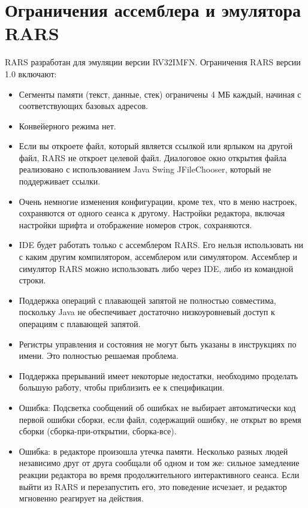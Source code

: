 \section{Ограничения ассемблера и эмулятора RARS}
RARS разработан для эмуляции версии RV32IMFN. Ограничения RARS версии 1.0 включают:
\begin{itemize}
    \item Сегменты памяти (текст, данные, стек) ограничены 4 МБ каждый, начиная с соответствующих базовых адресов.
    \item Конвейерного режима нет.
    \item Если вы откроете файл, который является ссылкой или ярлыком на другой файл, RARS не откроет целевой файл. Диалоговое окно открытия файла реализовано с использованием Java Swing JFileChooser, который не поддерживает ссылки.
    \item Очень немногие изменения конфигурации, кроме тех, что в меню настроек, сохраняются от одного сеанса к другому. Настройки редактора, включая настройки шрифта и отображение номеров строк, сохраняются.
    \item IDE будет работать только с ассемблером RARS. Его нельзя использовать ни с каким другим компилятором, ассемблером или симулятором. Ассемблер и симулятор RARS можно использовать либо через IDE, либо из командной строки.
    \item Поддержка операций с плавающей запятой не полностью совместима, поскольку Java не обеспечивает достаточно низкоуровневый доступ к операциям с плавающей запятой.
    \item Регистры управления и состояния не могут быть указаны в инструкциях по имени. Это полностью решаемая проблема.
    \item Поддержка прерываний имеет некоторые недостатки, необходимо проделать большую работу, чтобы приблизить ее к спецификации.
    \item Ошибка: Подсветка сообщений об ошибках не выбирает автоматически код первой ошибки сборки, если файл, содержащий ошибку, не открыт во время сборки (сборка-при-открытии, сборка-все).
    \item Ошибка: в редакторе произошла утечка памяти. Несколько разных людей независимо друг от друга сообщали об одном и том же: сильное замедление реакции редактора во время продолжительного интерактивного сеанса. Если выйти из RARS и перезапустить его, это поведение исчезает, и редактор мгновенно реагирует на действия.
\end{itemize}
